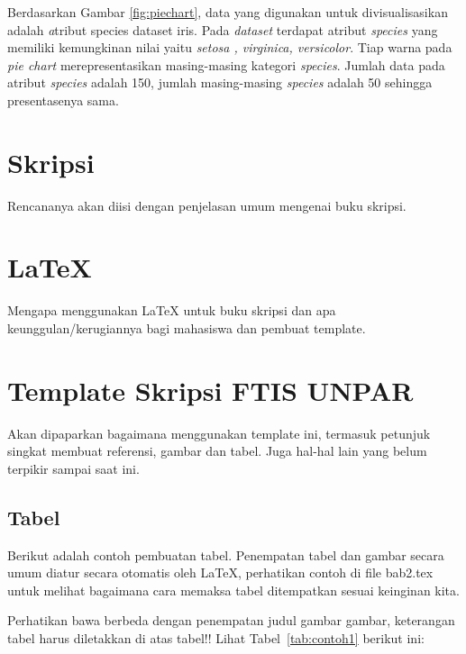 Berdasarkan Gambar \ref{fig:piechart}, data yang digunakan untuk divisualisasikan adalah \textit atribut {species dataset iris}. Pada \textit{dataset} terdapat atribut \textit{species} yang memiliki kemungkinan nilai yaitu \textit{setosa , virginica, versicolor}. Tiap warna pada \textit{pie chart} merepresentasikan masing-masing kategori \textit{species}. Jumlah data pada atribut \textit{species} adalah 150, jumlah masing-masing \textit{species} adalah 50 sehingga presentasenya sama.



\section{Skripsi}
\label{sec:skripsi} 
 
Rencananya akan diisi dengan penjelasan umum mengenai buku skripsi.


\section{\LaTeX}
\label{sec:latex}

Mengapa menggunakan \LaTeX{} untuk buku skripsi dan apa keunggulan/kerugiannya bagi mahasiswa dan pembuat template. 



\section{Template Skripsi FTIS UNPAR}
\label{sec:template}
 
Akan dipaparkan bagaimana menggunakan template ini, termasuk petunjuk singkat membuat referensi, gambar dan tabel.
Juga hal-hal lain yang belum terpikir sampai saat ini. 
 

\subsection{Tabel}  
Berikut adalah contoh pembuatan tabel. 
Penempatan tabel dan gambar secara umum diatur secara otomatis oleh \LaTeX{}, perhatikan contoh di file bab2.tex untuk melihat bagaimana cara memaksa tabel ditempatkan sesuai keinginan kita.

Perhatikan bawa berbeda dengan penempatan judul gambar gambar, keterangan tabel harus diletakkan di atas tabel!!
Lihat Tabel~\ref{tab:contoh1} berikut ini:

